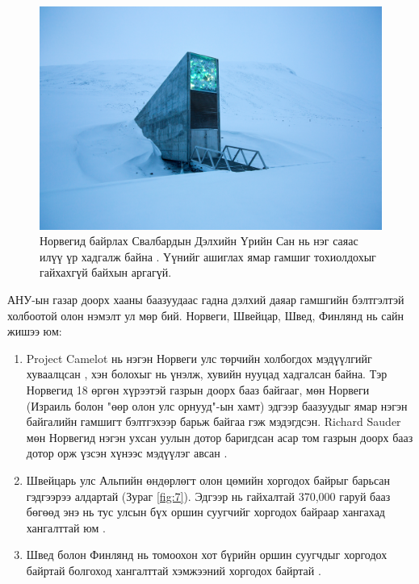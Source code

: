 \documentclass[10pt,twocolumn,letterpaper]{article}
\begin{document}
\begin{figure}[t]
\begin{center}
   \includegraphics[width=1\linewidth]{svalbard.jpg}
\end{center}
   \caption{Норвегид байрлах Свалбардын Дэлхийн Үрийн Сан нь нэг саяас илүү үр хадгалж байна \cite{24}. Үүнийг ашиглах ямар гамшиг тохиолдохыг гайхахгүй байхын аргагүй.}
\label{fig:8}
\label{fig:onecol}
\end{figure}

АНУ-ын газар доорх хааны баазуудаас гадна дэлхий даяар гамшгийн бэлтгэлтэй холбоотой олон нэмэлт ул мөр бий. Норвеги, Швейцар, Швед, Финлянд нь сайн жишээ юм:

\begin{flushleft}
\begin{enumerate}
    \item Project Camelot нь нэгэн Норвеги улс төрчийн холбогдох мэдүүлгийг хуваалцсан \cite{25,26}, хэн болохыг нь үнэлж, хувийн нууцад хадгалсан байна. Тэр Норвегид 18 өргөн хүрээтэй газрын доорх бааз байгааг, мөн Норвеги (Израиль болон "өөр олон улс орнууд"-ын хамт) эдгээр баазуудыг ямар нэгэн байгалийн гамшигт бэлтгэхээр барьж байгаа гэж мэдэгдсэн. Richard Sauder мөн Норвегид нэгэн ухсан уулын дотор баригдсан асар том газрын доорх бааз дотор орж үзсэн хүнээс мэдүүлэг авсан \cite{22}.
    \item Швейцарь улс Альпийн өндөрлөгт олон цөмийн хоргодох байрыг барьсан гэдгээрээ алдартай (Зураг \ref{fig:7}). Эдгээр нь гайхалтай 370,000 гаруй бааз бөгөөд энэ нь тус улсын бүх оршин суугчийг хоргодох байраар хангахад хангалттай юм \cite{27}.
    \item Швед болон Финлянд нь томоохон хот бүрийн оршин суугчдыг хоргодох байртай болгоход хангалттай хэмжээний хоргодох байртай \cite{27}. 
\end{enumerate}
\end{flushleft}
\end{document}
